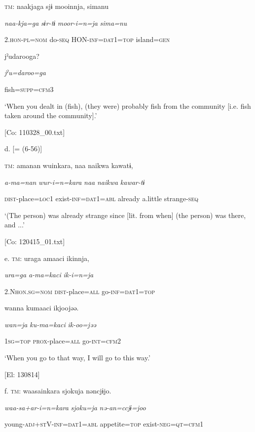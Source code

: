     \textsc{tm}:  naakjaga  sjɨ  mooinnja,  simanu

      \textit{naa-kja=ga}  \textit{sɨr-tɨ}  \textit{moor-i=n=ja}  \textit{sima=nu}

      2.\textsc{hon}-\textsc{pl}=\textsc{nom}  do-\textsc{seq}  HON-\textsc{inf}=\textsc{dat}1=\textsc{top}  island=\textsc{gen}

      jˀudarooga?

      \textit{jˀu=daroo=ga}

      fish=\textsc{supp}=\textsc{cfm}3

      ‘When you dealt in (fish), (they were) probably fish from the community [i.e. fish taken around the community].’

      [Co: 110328\_00.txt]

  d.  [= (6-56)]

    \textsc{tm}:  amanan  wuinkara,  naa  naikwa  kawatɨ,

      \textit{a-ma=nan}  \textit{wur-i=n=kara}  \textit{naa}  \textit{naikwa}  \textit{kawar-tɨ}

      \textsc{dist}-place=\textsc{loc}1  exist-\textsc{inf}=\textsc{dat}1=\textsc{abl}  already  a.little  strange-\textsc{seq}

      ‘(The person) was already strange since [lit. from when] (the person) was there, and ...’

      [Co: 120415\_01.txt]

  e.  \textsc{tm}:  uraga  amaaci  ikinnja,

      \textit{ura=ga}  \textit{a-ma=kaci}  \textit{ik-i=n=ja}

      2.N\textsc{hon}.\textsc{sg}=\textsc{nom}  \textsc{dist}-place=\textsc{all}  go-\textsc{inf}=\textsc{dat}1=\textsc{top}

      wanna  kumaaci  ikjoojəə.

      \textit{wan=ja}  \textit{ku-ma=kaci}  \textit{ik-oo=jəə}

      1\textsc{sg}=\textsc{top}  \textsc{prox}-place=\textsc{all}  go-\textsc{int}=\textsc{cfm}2

      ‘When you go to that way, I will go to this way.’

      [El: 130814]

  f.  \textsc{tm}:  waasainkara  {\textbar}sjoku{\textbar}ja  nəncjɨjo.

      \textit{waa-sa+ar-i=n=kara}  \textit{sjoku=ja}  \textit{nə-an=ccjɨ=joo}

      young-\textsc{adj}+\textsc{st}V-\textsc{inf}=\textsc{dat}1=\textsc{abl}  appetite=\textsc{top}  exist-\textsc{neg}=\textsc{qt}=\textsc{cfm}1

